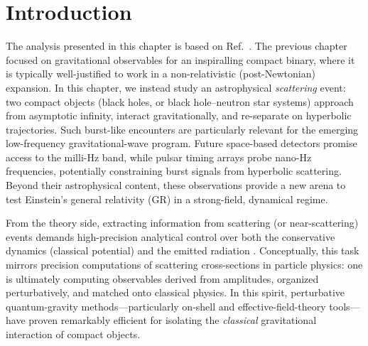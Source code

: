\section{Introduction} \label{intro}
The analysis presented in this chapter is based on Ref.~\cite{Bhattacharyya:2024aeq}.
The previous chapter focused on gravitational observables for an inspiralling compact binary, where it is typically well-justified to work in a non-relativistic (post-Newtonian) expansion. In this chapter, we instead study an astrophysical \emph{scattering} event: two compact objects (black holes, or black hole--neutron star systems) approach from asymptotic infinity, interact gravitationally, and re-separate on hyperbolic trajectories. Such burst-like encounters are particularly relevant for the emerging low-frequency gravitational-wave program. Future space-based detectors promise access to the milli-Hz band, while pulsar timing arrays probe nano-Hz frequencies, potentially constraining burst signals from hyperbolic scattering. Beyond their astrophysical content, these observations provide a new arena to test Einstein’s general relativity (GR) in a strong-field, dynamical regime.

From the theory side, extracting information from scattering (or near-scattering) events demands high-precision analytical control over both the conservative dynamics (classical potential) and the emitted radiation \cite{Purrer:2019jcp}. Conceptually, this task mirrors precision computations of scattering cross-sections in particle physics: one is ultimately computing observables derived from amplitudes, organized perturbatively, and matched onto classical physics. In this spirit, perturbative quantum-gravity methods—particularly on-shell and effective-field-theory tools—have proven remarkably efficient for isolating the \emph{classical} gravitational interaction of compact objects.


